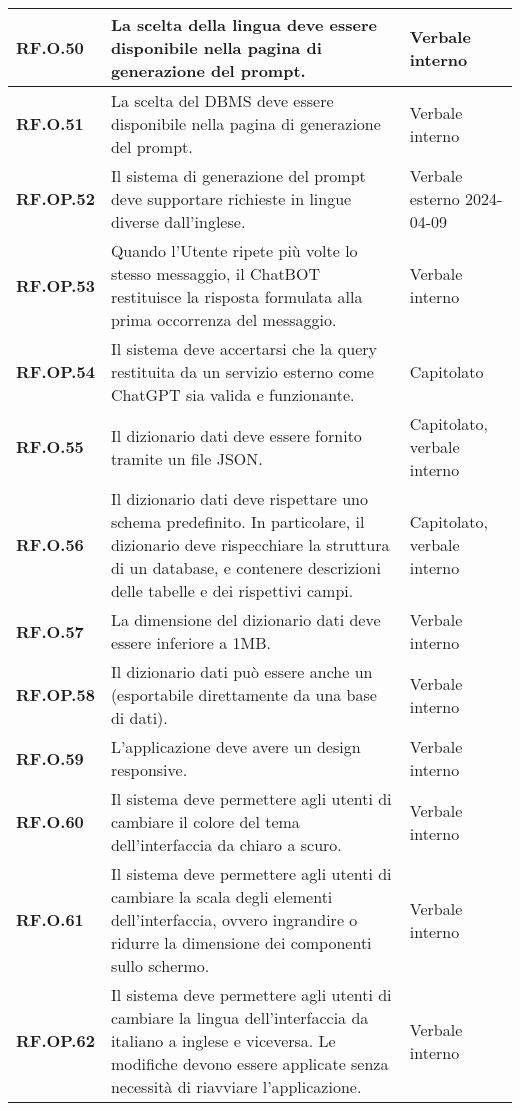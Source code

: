 \begin{adjustwidth}{-0.5cm}{-0.5cm}
\begin{longtable}{|P{3cm}|P{6,5cm}|>{\arraybackslash}P{4cm}|}
    \textbf{RF.O.50} & La scelta della lingua deve essere disponibile nella pagina di generazione del prompt. & Verbale interno \\
    \hline
    \textbf{RF.O.51} & La scelta del DBMS deve essere disponibile nella pagina di generazione del prompt. & Verbale interno \\
    \hline
    \textbf{RF.OP.52} & Il sistema di generazione del prompt deve supportare richieste in lingue diverse dall'inglese. & Verbale esterno 2024-04-09 \\
    \hline
    \textbf{RF.OP.53} & Quando l'Utente ripete più volte lo stesso messaggio, il ChatBOT restituisce la risposta formulata alla prima occorrenza del messaggio. & Verbale interno \\
    \hline
    \textbf{RF.OP.54} & Il sistema deve accertarsi che la query  restituita da un servizio esterno come ChatGPT sia valida e funzionante. & Capitolato \\
    \hline
    \textbf{RF.O.55} & Il dizionario dati deve essere fornito tramite un file JSON. & Capitolato, verbale interno \\
    \hline
    \textbf{RF.O.56} & Il dizionario dati deve rispettare uno schema predefinito. In particolare, il dizionario deve rispecchiare la struttura di un database, e contenere descrizioni delle tabelle e dei rispettivi campi. & Capitolato, verbale interno \\
    \hline
    \textbf{RF.O.57} & La dimensione del dizionario dati deve essere inferiore a 1MB. & Verbale interno \\
    \hline
    \textbf{RF.OP.58} & Il dizionario dati può essere anche un  (esportabile direttamente da una base di dati). & Verbale interno \\
    \hline
    \textbf{RF.O.59} & L'applicazione deve avere un design responsive. & Verbale interno \\
    \hline
    \textbf{RF.O.60} & Il sistema deve permettere agli utenti di cambiare il colore del tema dell'interfaccia da chiaro a scuro. & Verbale interno \\
    \hline
    \textbf{RF.O.61} & Il sistema deve permettere agli utenti di cambiare la scala degli elementi dell'interfaccia, ovvero ingrandire o ridurre la dimensione dei componenti sullo schermo. & Verbale interno \\
    \hline
    \textbf{RF.OP.62} & Il sistema deve permettere agli utenti di cambiare la lingua dell'interfaccia da italiano a inglese e viceversa. Le modifiche devono essere applicate senza necessità di riavviare l'applicazione. & Verbale interno \\
  \end{longtable}
\end{adjustwidth}
\egroup

